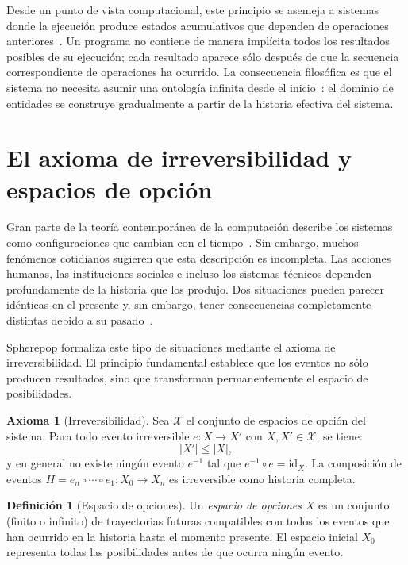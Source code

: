 \documentclass[12pt]{article}
\theoremstyle{plain}
\theoremstyle{definition}
\newtheorem{definition}[theorem]{Definición}
\newtheorem{axiom}[theorem]{Axioma}
\begin{document}
Desde un punto de vista computacional, este principio se asemeja a sistemas donde la ejecución produce estados acumulativos que dependen de operaciones anteriores~\cite{okasaki,kleppmann}. Un programa no contiene de manera implícita todos los resultados posibles de su ejecución; cada resultado aparece sólo después de que la secuencia correspondiente de operaciones ha ocurrido. La consecuencia filosófica es que el sistema no necesita asumir una ontología infinita desde el inicio~\cite{whitehead}: el dominio de entidades se construye gradualmente a partir de la historia efectiva del sistema.

\section{El axioma de irreversibilidad y espacios de opción}
\label{sec:irreversibilidad}

Gran parte de la teoría contemporánea de la computación describe los sistemas como configuraciones que cambian con el tiempo~\cite{abramsky,plotkin}. Sin embargo, muchos fenómenos cotidianos sugieren que esta descripción es incompleta. Las acciones humanas, las instituciones sociales e incluso los sistemas técnicos dependen profundamente de la historia que los produjo. Dos situaciones pueden parecer idénticas en el presente y, sin embargo, tener consecuencias completamente distintas debido a su pasado~\cite{prigogine,landauer}.

Spherepop formaliza este tipo de situaciones mediante el axioma de irreversibilidad. El principio fundamental establece que los eventos no sólo producen resultados, sino que transforman permanentemente el espacio de posibilidades.

\begin{axiom}[Irreversibilidad]
\label{ax:irreversibilidad}
Sea $\mathcal{X}$ el conjunto de espacios de opción del sistema. Para todo evento irreversible $e: X \to X'$ con $X, X' \in \mathcal{X}$, se tiene:
\[
|X'| \leq |X|,
\]
y en general no existe ningún evento $e^{-1}$ tal que $e^{-1} \circ e = \mathrm{id}_X$. La composición de eventos $H = e_n \circ \cdots \circ e_1 : X_0 \to X_n$ es irreversible como historia completa.
\end{axiom}

\begin{definition}[Espacio de opciones]
\label{def:espacio_opciones}
Un \emph{espacio de opciones} $X$ es un conjunto (finito o infinito) de trayectorias futuras compatibles con todos los eventos que han ocurrido en la historia hasta el momento presente. El espacio inicial $X_0$ representa todas las posibilidades antes de que ocurra ningún evento.
\end{definition}
\end{document}
